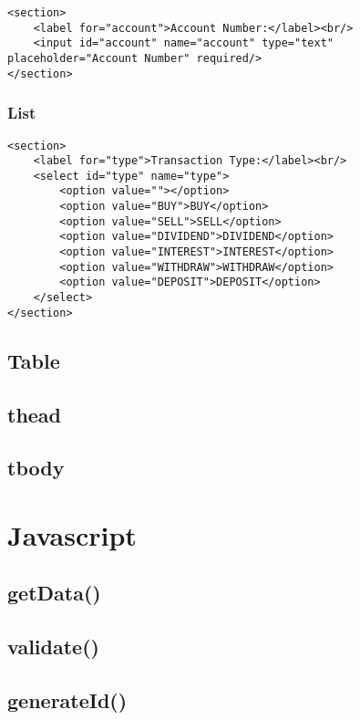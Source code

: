 \documentclass[letterpaper]{article}
\begin{document}
\begin{lstlisting}[firstnumber=16]
<section>
    <label for="account">Account Number:</label><br/>
    <input id="account" name="account" type="text" placeholder="Account Number" required/>
</section>
\end{lstlisting}

\subsubsection{List}

\begin{lstlisting}[firstnumber=21]
<section>
    <label for="type">Transaction Type:</label><br/>
    <select id="type" name="type">
        <option value=""></option>
        <option value="BUY">BUY</option>
        <option value="SELL">SELL</option>
        <option value="DIVIDEND">DIVIDEND</option>
        <option value="INTEREST">INTEREST</option>
        <option value="WITHDRAW">WITHDRAW</option>
        <option value="DEPOSIT">DEPOSIT</option>
    </select>
</section>
\end{lstlisting}

\subsection{Table}

\subsection{thead}

\subsection{tbody}

\newpage

\section{Javascript}\label{JS}

\subsection{getData()}

\subsection{validate()}

\subsection{generateId()}
\end{document}
